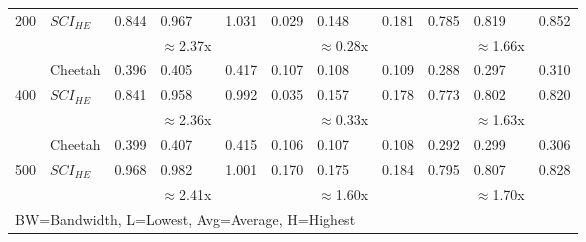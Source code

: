 \begin{tabular}{lllllllllll}
200                                           & $SCI_{HE}$ & 0.844  & 0.967    & 1.031 & 0.029         & 0.148           & 0.181         & 0.785         & 0.819           & 0.852         \\ \cline{3-11} 
                                              &         &        & $\approx$2.37x    &       &               & $\approx$0.28x          &               &               & $\approx$1.66x           &               \\ \hline
                                              & Cheetah & 0.396  & 0.405    & 0.417 & 0.107         & 0.108           & 0.109         & 0.288         & 0.297           & 0.310         \\
400                                           & $SCI_{HE}$ & 0.841  & 0.958    & 0.992 & 0.035         & 0.157           & 0.178         & 0.773         & 0.802           & 0.820         \\ \cline{3-11} 
                                              &         &        & $\approx$2.36x    &       &               & $\approx$0.33x           &               &               & $\approx$1.63x           &               \\ \hline
                                              & Cheetah & 0.399  & 0.407    & 0.415 & 0.106         & 0.107           & 0.108         & 0.292         & 0.299           & 0.306         \\
500                                           & $SCI_{HE}$ & 0.968  & 0.982    & 1.001 & 0.170         & 0.175           & 0.184         & 0.795         & 0.807           & 0.828         \\ \cline{2-11} 
                                              &         &        & $\approx$2.41x    &       &               & $\approx$1.60x           &               &               & $\approx$1.70x          &               \\ \hline
\multicolumn{11}{l}{BW=Bandwidth, L=Lowest, Avg=Average, H=Highest}             
\end{tabular}